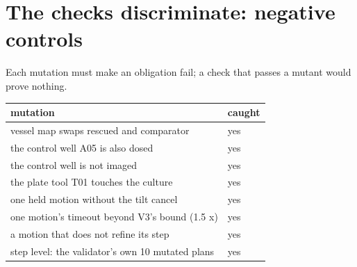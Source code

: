 \documentclass[10pt,a4paper]{article}
\theoremstyle{plain}\newtheorem{theorem}{Theorem}\newtheorem{lemma}{Lemma}\newtheorem{corollary}{Corollary}
\theoremstyle{definition}\newtheorem{definition}{Definition}\newtheorem{assumption}{Assumption}
\theoremstyle{remark}\newtheorem*{remark}{Remark}
\begin{document}
\section{The checks discriminate: negative controls}
Each mutation must make an obligation fail; a check that passes a mutant would prove nothing.
\begin{center}\small\begin{tabularx}{\linewidth}{@{}Xl@{}}\toprule mutation & caught \\\midrule
vessel map swaps rescued and comparator & yes \\
the control well A05 is also dosed & yes \\
the control well is not imaged & yes \\
the plate tool T01 touches the culture & yes \\
one held motion without the tilt cancel & yes \\
one motion's timeout beyond V3's bound (1.5 x) & yes \\
a motion that does not refine its step & yes \\
step level: the validator's own 10 mutated plans & yes
\\\bottomrule\end{tabularx}\end{center}
\end{document}
